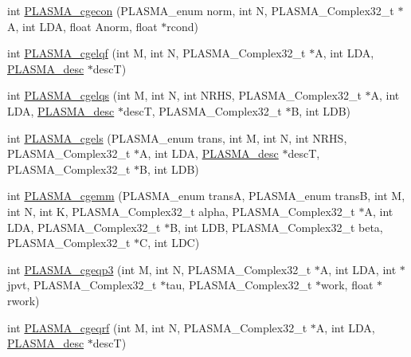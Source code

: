 \begin{DoxyCompactItemize}
int \hyperlink{group__PLASMA__Complex32__t_ga59c8cdc7aee5dab4baa2059b6d508b84_ga59c8cdc7aee5dab4baa2059b6d508b84}{P\+L\+A\+S\+M\+A\+\_\+cgecon} (P\+L\+A\+S\+M\+A\+\_\+enum norm, int N, P\+L\+A\+S\+M\+A\+\_\+\+Complex32\+\_\+t $\ast$A, int L\+D\+A, float Anorm, float $\ast$rcond)
\item 
int \hyperlink{group__PLASMA__Complex32__t_gadab1e78967134c5e784bb80d03760b25_gadab1e78967134c5e784bb80d03760b25}{P\+L\+A\+S\+M\+A\+\_\+cgelqf} (int M, int N, P\+L\+A\+S\+M\+A\+\_\+\+Complex32\+\_\+t $\ast$A, int L\+D\+A, \hyperlink{structplasma__desc__t}{P\+L\+A\+S\+M\+A\+\_\+desc} $\ast$desc\+T)
\item 
int \hyperlink{group__PLASMA__Complex32__t_gab6c2a5892b81e8ee9740268d06adf9b1_gab6c2a5892b81e8ee9740268d06adf9b1}{P\+L\+A\+S\+M\+A\+\_\+cgelqs} (int M, int N, int N\+R\+H\+S, P\+L\+A\+S\+M\+A\+\_\+\+Complex32\+\_\+t $\ast$A, int L\+D\+A, \hyperlink{structplasma__desc__t}{P\+L\+A\+S\+M\+A\+\_\+desc} $\ast$desc\+T, P\+L\+A\+S\+M\+A\+\_\+\+Complex32\+\_\+t $\ast$B, int L\+D\+B)
\item 
int \hyperlink{group__PLASMA__Complex32__t_ga047c51e0c630ac15b2679b8352013f7b_ga047c51e0c630ac15b2679b8352013f7b}{P\+L\+A\+S\+M\+A\+\_\+cgels} (P\+L\+A\+S\+M\+A\+\_\+enum trans, int M, int N, int N\+R\+H\+S, P\+L\+A\+S\+M\+A\+\_\+\+Complex32\+\_\+t $\ast$A, int L\+D\+A, \hyperlink{structplasma__desc__t}{P\+L\+A\+S\+M\+A\+\_\+desc} $\ast$desc\+T, P\+L\+A\+S\+M\+A\+\_\+\+Complex32\+\_\+t $\ast$B, int L\+D\+B)
\item 
int \hyperlink{group__PLASMA__Complex32__t_ga5505cdf8794ea00c9160d656d2a00ec9_ga5505cdf8794ea00c9160d656d2a00ec9}{P\+L\+A\+S\+M\+A\+\_\+cgemm} (P\+L\+A\+S\+M\+A\+\_\+enum trans\+A, P\+L\+A\+S\+M\+A\+\_\+enum trans\+B, int M, int N, int K, P\+L\+A\+S\+M\+A\+\_\+\+Complex32\+\_\+t alpha, P\+L\+A\+S\+M\+A\+\_\+\+Complex32\+\_\+t $\ast$A, int L\+D\+A, P\+L\+A\+S\+M\+A\+\_\+\+Complex32\+\_\+t $\ast$B, int L\+D\+B, P\+L\+A\+S\+M\+A\+\_\+\+Complex32\+\_\+t beta, P\+L\+A\+S\+M\+A\+\_\+\+Complex32\+\_\+t $\ast$C, int L\+D\+C)
\item 
int \hyperlink{group__PLASMA__Complex32__t_ga1702f0732bb5432db6f3eb07200b1c1c_ga1702f0732bb5432db6f3eb07200b1c1c}{P\+L\+A\+S\+M\+A\+\_\+cgeqp3} (int M, int N, P\+L\+A\+S\+M\+A\+\_\+\+Complex32\+\_\+t $\ast$A, int L\+D\+A, int $\ast$jpvt, P\+L\+A\+S\+M\+A\+\_\+\+Complex32\+\_\+t $\ast$tau, P\+L\+A\+S\+M\+A\+\_\+\+Complex32\+\_\+t $\ast$work, float $\ast$rwork)
\item 
int \hyperlink{group__PLASMA__Complex32__t_gae8490d9c587725716adbb347d85537b2_gae8490d9c587725716adbb347d85537b2}{P\+L\+A\+S\+M\+A\+\_\+cgeqrf} (int M, int N, P\+L\+A\+S\+M\+A\+\_\+\+Complex32\+\_\+t $\ast$A, int L\+D\+A, \hyperlink{structplasma__desc__t}{P\+L\+A\+S\+M\+A\+\_\+desc} $\ast$desc\+T)

\end{DoxyCompactItemize}
